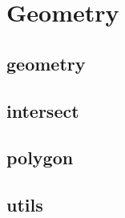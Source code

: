 \section{Geometry}

\subsection{geometry}


\subsection{intersect}


\subsection{polygon}


\subsection{utils}

